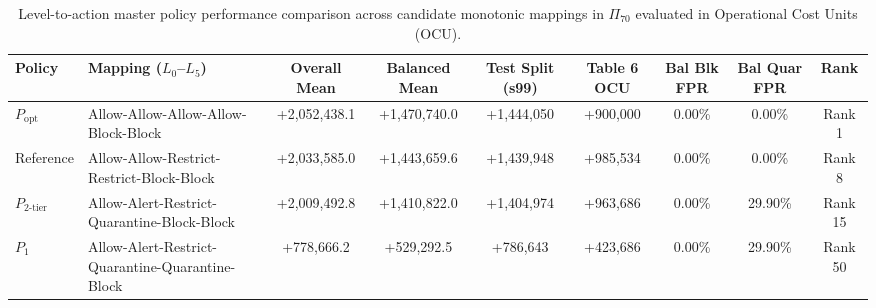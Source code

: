 \documentclass[journal,10pt,onecolumn]{IEEEtran}
\begin{document}
\begin{table}[t]
\caption{Level-to-action master policy performance comparison across candidate monotonic mappings in $\Pi_{70}$ evaluated in Operational Cost Units (OCU).}
\label{tab:master_policy}
\centering
\footnotesize
\begin{tabular}{llccccccc}
\toprule
\textbf{Policy} & \textbf{Mapping ($L_0$--$L_5$)} & \textbf{Overall Mean} & \textbf{Balanced Mean} & \textbf{Test Split (s99)} & \textbf{Table 6 OCU} & \textbf{Bal Blk FPR} & \textbf{Bal Quar FPR} & \textbf{Rank} \\
\midrule
$P_{\text{opt}}$ & Allow-Allow-Allow-Allow-Block-Block & +2,052,438.1 & +1,470,740.0 & +1,444,050 & +900,000 & 0.00\% & 0.00\% & Rank 1 \\
Reference & Allow-Allow-Restrict-Restrict-Block-Block & +2,033,585.0 & +1,443,659.6 & +1,439,948 & +985,534 & 0.00\% & 0.00\% & Rank 8 \\
$P_{2\text{-tier}}$ & Allow-Alert-Restrict-Quarantine-Block-Block & +2,009,492.8 & +1,410,822.0 & +1,404,974 & +963,686 & 0.00\% & 29.90\% & Rank 15 \\
$P_1$ & Allow-Alert-Restrict-Quarantine-Quarantine-Block & +778,666.2 & +529,292.5 & +786,643 & +423,686 & 0.00\% & 29.90\% & Rank 50 \\
\bottomrule
\end{tabular}
\end{table}
\end{document}
